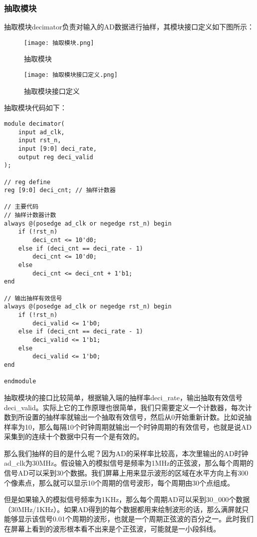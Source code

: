 \documentclass[lang=cn,a4paper,newtx]{elegantpaper}
\begin{document}
\subsubsection{抽取模块}
抽取模块decimator负责对输入的AD数据进行抽样，其模块接口定义如下图所示： 
\begin{figure}[ht]
	\begin{minipage}[t]{0.48\textwidth}
		\centering
		\texttt{[image: 抽取模块.png]}
		\caption{抽取模块}
		\label{fig:抽取模块}
	\end{minipage}
	\hfill %
	\begin{minipage}[t]{0.48\textwidth}
		\centering
		\texttt{[image: 抽取模块接口定义.png]}
		\caption{抽取模块接口定义}
		\label{fig:抽取模块接口定义}
	\end{minipage}
\end{figure}
抽取模块代码如下：
\begin{lstlisting}
module decimator(
    input ad_clk,
    input rst_n,
    input [9:0] deci_rate,
    output reg deci_valid
);

// reg define
reg [9:0] deci_cnt; // 抽样计数器

// 主要代码
// 抽样计数器计数
always @(posedge ad_clk or negedge rst_n) begin
    if (!rst_n)
        deci_cnt <= 10'd0;
    else if (deci_cnt == deci_rate - 1)
        deci_cnt <= 10'd0;
    else
        deci_cnt <= deci_cnt + 1'b1;
end

// 输出抽样有效信号
always @(posedge ad_clk or negedge rst_n) begin
    if (!rst_n)
        deci_valid <= 1'b0;
    else if (deci_cnt == deci_rate - 1)
        deci_valid <= 1'b1;
    else
        deci_valid <= 1'b0;
end

endmodule

\end{lstlisting}
抽取模块的接口比较简单，根据输入端的抽样率deci\_rate，输出抽取有效信号deci\_valid。实际上它的工作原理也很简单，我们只需要定义一个计数器，每次计数到所设置的抽样率就输出一个抽取有效信号，然后从0开始重新计数。比如说抽样率为10，那么每隔10个时钟周期就输出一个时钟周期的有效信号，也就是说AD采集到的连续十个数据中只有一个是有效的。

那么我们抽样的目的是什么呢？因为AD的采样率比较高，本次里输出的AD时钟ad\_clk为30MHz。假设输入的模拟信号是频率为1MHz的正弦波，那么每个周期的信号AD可以采到30个数据。我们屏幕上用来显示波形的区域在水平方向上有300个像素点，那么就可以显示10个周期的信号波形，每个周期由30个点组成。

但是如果输入的模拟信号频率为1KHz，那么每个周期AD可以采到30\_000个数据（30MHz/1KHz）。如果AD得到的每个数据都用来绘制波形的话，那么满屏就只能够显示该信号0.01个周期的波形，也就是一个周期正弦波的百分之一。此时我们在屏幕上看到的波形根本看不出来是个正弦波，可能就是一小段斜线。
\end{document}
